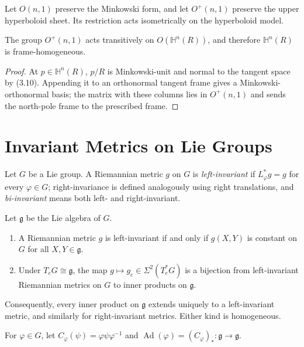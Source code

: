 Let $O(n,1)$ preserve the Minkowski form, and let $O^+(n,1)$ preserve the upper hyperboloid sheet. Its restriction acts isometrically on the hyperboloid model.

\begin{proposition}
\label{prop:lorentz-group-transitive}

The group $O^+(n,1)$ acts transitively on $O(\mathbb H^n(R))$, and therefore $\mathbb H^n(R)$ is frame-homogeneous.
\end{proposition}
\begin{proof}
\sketch At $p\in\mathbb H^n(R)$, $p/R$ is Minkowski-unit and normal to the tangent space by (3.10). Appending it to an orthonormal tangent frame gives a Minkowski-orthonormal basis; the matrix with these columns lies in $O^+(n,1)$ and sends the north-pole frame to the prescribed frame.
\end{proof}
\section{Invariant Metrics on Lie Groups}

Let $G$ be a Lie group. A Riemannian metric $g$ on $G$ is \emph{left-invariant} if
$L_\varphi^*g=g$ for every $\varphi\in G$; right-invariance is defined analogously
using right translations, and \emph{bi-invariant} means both left- and
right-invariant.

\begin{lemma}
\label{lem:left-invariant-metrics-lie-group}
Let $\mathfrak g$ be the Lie algebra of $G$.
\begin{enumerate}[label=(\alph*)]
\item A Riemannian metric $g$ is left-invariant if and only if $g(X,Y)$ is
constant on $G$ for all $X,Y\in\mathfrak g$.
\item Under $T_eG\cong\mathfrak g$, the map $g\mapsto g_e\in\Sigma^2(T_e^*G)$
is a bijection from left-invariant Riemannian metrics on $G$ to inner products
on $\mathfrak g$.
\end{enumerate}
\end{lemma}

Consequently, every inner product on $\mathfrak g$ extends uniquely to a
left-invariant metric, and similarly for right-invariant metrics. Either kind
is homogeneous.

For $\varphi\in G$, let $C_\varphi(\psi)=\varphi\psi\varphi^{-1}$ and
$\operatorname{Ad}(\varphi)=(C_\varphi)_*\colon\mathfrak g\to\mathfrak g$.

